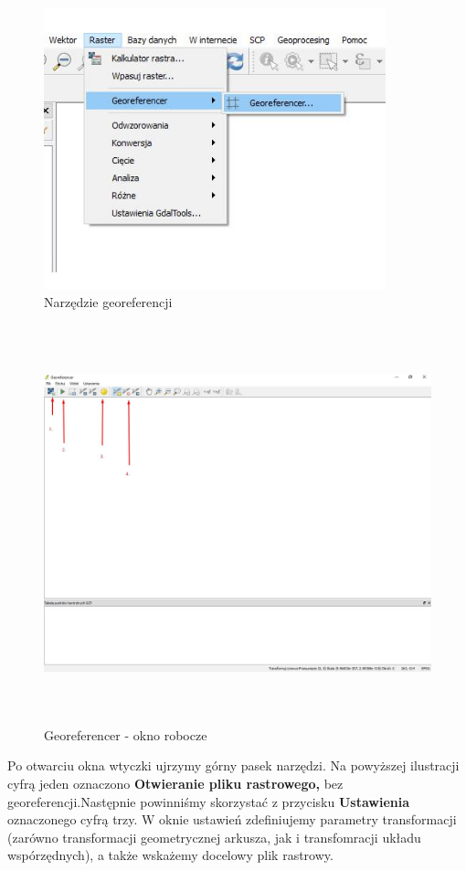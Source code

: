 \documentclass[12pt,a4paper]{book}
\begin{document}
\begin{center}
\begin{figure}
\includegraphics[width=9.899cm,height=8.149cm]{004-georef.jpg}
\caption{Narzędzie georeferencji}
\end{figure}
\end{center}


\begin{center}
\begin{figure}
\includegraphics[width=14.997cm,height=11.539cm]{004-georef-okno.jpg}
\caption{Georeferencer - okno robocze}
\end{figure}
\end{center}
Po otwarciu okna wtyczki ujrzymy górny pasek narzędzi. Na powyższej ilustracji cyfrą jeden oznaczono \textbf{Otwieranie pliku rastrowego, }bez georeferencji.Następnie powinniśmy skorzystać z przycisku \textbf{Ustawienia }oznaczonego cyfrą trzy. W oknie ustawień zdefiniujemy parametry transformacji (zarówno transformacji geometrycznej arkusza, jak i transfomracji układu wspórzędnych), a także wskażemy docelowy plik rastrowy.
\end{document}
